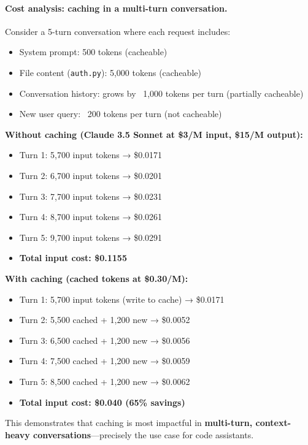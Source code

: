 \documentclass[english]{article}
\begin{document}
\paragraph{Cost analysis: caching in a multi-turn conversation.}

Consider a 5-turn conversation where each request includes:
\begin{itemize}
    \item System prompt: 500 tokens (cacheable)
    \item File content (\texttt{auth.py}): 5,000 tokens (cacheable)
    \item Conversation history: grows by ~1,000 tokens per turn (partially cacheable)
    \item New user query: ~200 tokens per turn (not cacheable)
\end{itemize}

\textbf{Without caching (Claude 3.5 Sonnet at \$3/M input, \$15/M output):}
\begin{itemize}
    \item Turn 1: 5,700 input tokens → \$0.0171
    \item Turn 2: 6,700 input tokens → \$0.0201
    \item Turn 3: 7,700 input tokens → \$0.0231
    \item Turn 4: 8,700 input tokens → \$0.0261
    \item Turn 5: 9,700 input tokens → \$0.0291
    \item \textbf{Total input cost: \$0.1155}
\end{itemize}

\textbf{With caching (cached tokens at \$0.30/M):}
\begin{itemize}
    \item Turn 1: 5,700 input tokens (write to cache) → \$0.0171
    \item Turn 2: 5,500 cached + 1,200 new → \$0.0052
    \item Turn 3: 6,500 cached + 1,200 new → \$0.0056
    \item Turn 4: 7,500 cached + 1,200 new → \$0.0059
    \item Turn 5: 8,500 cached + 1,200 new → \$0.0062
    \item \textbf{Total input cost: \$0.040 (65\% savings)}
\end{itemize}

This demonstrates that caching is most impactful in \textbf{multi-turn, context-heavy conversations}—precisely the use case for code assistants.
\end{document}
